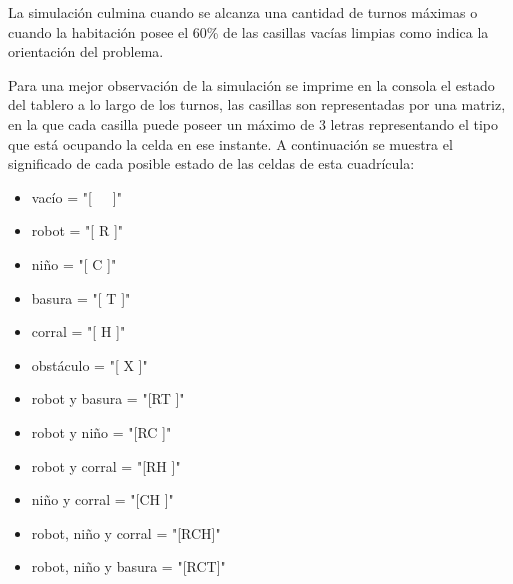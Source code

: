 \documentclass[titlepage,11pt]{scrartcl}
\begin{document}
La simulación culmina cuando se alcanza una cantidad de turnos máximas o cuando la habitación posee el 60\% de las casillas vacías limpias como indica la orientación del problema.

Para una mejor observación de la simulación se imprime en la consola el estado del tablero a lo largo de los turnos, las casillas son representadas por una matriz, en la que cada casilla puede poseer un máximo de 3 letras representando el tipo que está ocupando la celda en ese instante. A continuación se muestra el significado de cada posible estado de las celdas de esta cuadrícula:

\begin{itemize}
    \item vacío = "[\ \ \ ]"
    \item robot = "[ R ]"
    \item niño = "[ C ]"
    \item basura = "[ T ]"
    \item corral = "[ H ]"
    \item obstáculo = "[ X ]"
    \item robot y basura = "[RT ]"
    \item robot y niño = "[RC ]"
    \item robot y corral = "[RH ]"
    \item niño y corral = "[CH ]"
    \item robot, niño y corral = "[RCH]"
    \item robot, niño y basura = "[RCT]"
\end{itemize}
\end{document}
